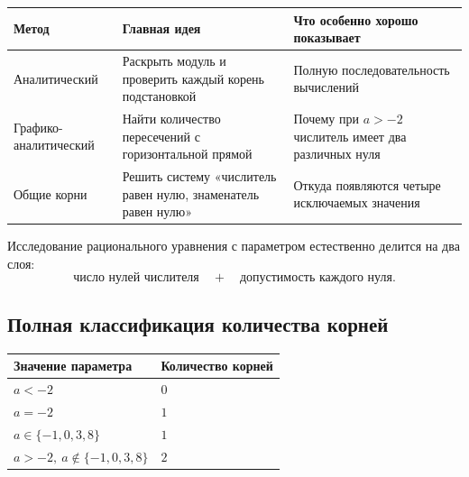 \begin{center}
  \renewcommand{\arraystretch}{1.38}
  \begin{tabularx}{\textwidth}{
      >{\raggedright\arraybackslash}p{}
      >{\raggedright\arraybackslash}p{}
      >{\raggedright\arraybackslash}X
    }
    \toprule
    \rowcolor{TableHeader}
    Метод & Главная идея & Что особенно хорошо показывает \\
    \midrule
    Аналитический
      & Раскрыть модуль и проверить каждый корень подстановкой
      & Полную последовательность вычислений \\
    \addlinespace[0.25em]
    Графико-аналитический
      & Найти количество пересечений с горизонтальной прямой
      & Почему при \(a>-2\) числитель имеет два различных нуля \\
    \addlinespace[0.25em]
    Общие корни
      & Решить систему «числитель равен нулю, знаменатель равен нулю»
      & Откуда появляются четыре исключаемых значения \\
    \bottomrule
  \end{tabularx}
\end{center}

\begin{propertybox}
  Исследование рационального уравнения с параметром естественно делится на
  два слоя:
  \[
    \text{число нулей числителя}
    \quad+\quad
    \text{допустимость каждого нуля}.
  \]
\end{propertybox}

\subsection{Полная классификация количества корней}

\begin{center}
  \renewcommand{\arraystretch}{1.38}
  \begin{tabularx}{\textwidth}{
      >{\centering\arraybackslash}p{}
      >{\centering\arraybackslash}X
    }
    \toprule
    \rowcolor{TableHeader}
    Значение параметра & Количество корней \\
    \midrule
    \(a<-2\) & \(0\) \\
    \(a=-2\) & \(1\) \\
    \(a\in\{-1,0,3,8\}\) & \(1\) \\
    \(a>-2,\ a\notin\{-1,0,3,8\}\) & \(2\) \\
    \bottomrule
  \end{tabularx}
\end{center}

